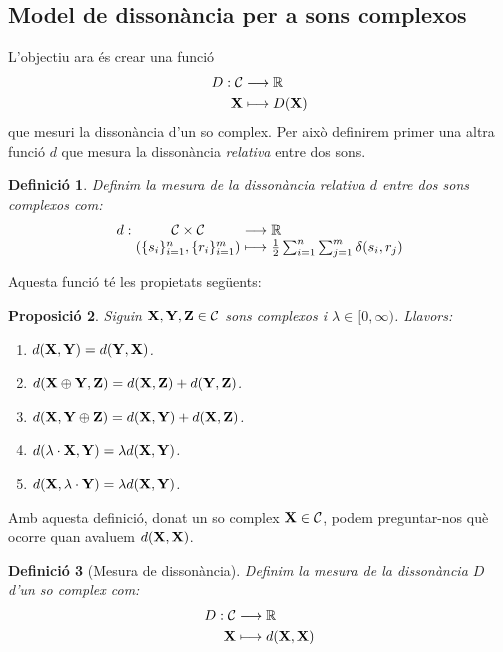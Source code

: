 \documentclass{article}
\theoremstyle{math}
\newtheorem{definition}{Definició}[section]
\newtheorem{prop}[definition]{Proposició}
\theoremstyle{TheoremNum}
\newcommand{\0}{\ensuremath{\vb{0}}}
\newcommand{\X}{\ensuremath{\vb{X}}}
\newcommand{\Y}{\ensuremath{\vb{Y}}}
\newcommand{\Z}{\ensuremath{\vb{Z}}}
\newcommand{\RR}{\ensuremath{\mathbb{R}}} %
\begin{document}
\subsection{Model de dissonància per a sons complexos}
L'objectiu ara és crear una funció 
\begin{align*}
    D:\mathcal{C}&\longrightarrow\RR\\
    \X&\longmapsto D(\X)
\end{align*}
que mesuri la dissonància d'un so complex. Per això definirem primer una altra funció $d$ que mesura la dissonància \textit{relativa} entre dos sons.
\begin{definition}
    Definim la \textit{mesura de la dissonància relativa $d$} entre dos sons complexos com:
    \begin{equation*}
        \begin{array}{r@{\hspace{0.5\tabcolsep}}c@{\hspace{0.5\tabcolsep}}c@{\hspace{0.5\tabcolsep}}l}
            d:&\mathcal{C}\times\mathcal{C}&\longrightarrow&\RR\\
        &(\{s_i\}_{i=1}^n,\{r_i\}_{i=1}^m)&\longmapsto&\frac{1}{2}\sum_{i=1}^n\sum_{j=1}^m\delta(s_i,r_j)
        \end{array}
    \end{equation*}
\end{definition}
\noindent Aquesta funció té les propietats següents:
\begin{prop}\label{prop_dem1}
    Siguin $\X,\Y,\Z\in\mathcal{C}$ sons complexos i $\lambda\in[0,\infty)$. Llavors:
    \begin{enumerate}[label=$d$\arabic*),ref=$d$\arabic*]
        \item\label{d1} $d(\X,\Y)=d(\Y,\X)$.
        \item\label{d2} $d(\X\oplus\Y,\Z)=d(\X,\Z)+d(\Y,\Z)$.
        \item\label{d3} $d(\X,\Y\oplus\Z)=d(\X,\Y)+d(\X,\Z)$.
        \item\label{d4} $d(\lambda\cdot\X,\Y)=\lambda d(\X,\Y)$.
        \item\label{d5} $d(\X,\lambda\cdot\Y)=\lambda d(\X,\Y)$.
    \end{enumerate}
\end{prop}
\noindent Amb aquesta definició, donat un so complex $\X\in\mathcal{C}$, podem preguntar-nos què ocorre quan avaluem $d(\X,\X)$.
\begin{definition}[Mesura de dissonància]
    Definim la \textit{mesura de la dissonància $D$ d'un so complex} com:
    \begin{align*}
        D:\mathcal{C}&\longrightarrow\RR\\
        \X&\longmapsto d(\X,\X)
    \end{align*}
\end{definition}
\end{document}

